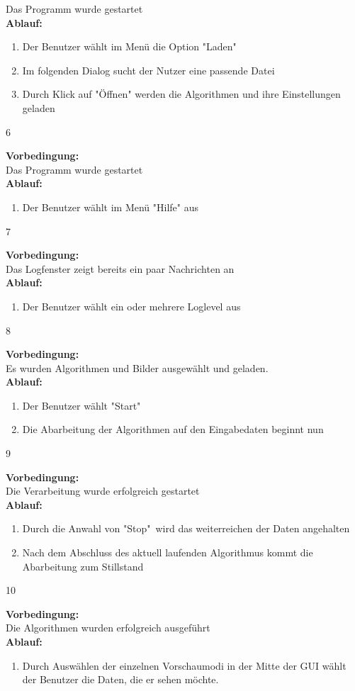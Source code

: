 {{{			Das Programm wurde gestartet
			\\\textbf{Ablauf:}
			\begin{enumerate}
				\item Der Benutzer wählt im Menü die Option "{}Laden"
				\item Im folgenden Dialog sucht der Nutzer eine passende Datei
				\item Durch Klick auf "{}Öffnen" werden die Algorithmen und ihre Einstellungen geladen
			\end{enumerate}
		}
		{6}{
			\textbf{Vorbedingung:}\\
			Das Programm wurde gestartet
			\\\textbf{Ablauf:}
			\begin{enumerate}
				\item Der Benutzer wählt im Menü "{}Hilfe" aus
			\end{enumerate}
		}
		{7}{
			\textbf{Vorbedingung:}\\
			Das Logfenster zeigt bereits ein paar Nachrichten an
			\\\textbf{Ablauf:}
			\begin{enumerate}
				\item Der Benutzer wählt ein oder mehrere Loglevel aus
			\end{enumerate}
		}
		{8}{
			\textbf{Vorbedingung:}\\
			Es wurden Algorithmen und Bilder ausgewählt und geladen.
			\\\textbf{Ablauf:}
			\begin{enumerate}
				\item Der Benutzer wählt "{}Start"
				\item Die Abarbeitung der Algorithmen auf den Eingabedaten beginnt nun
			\end{enumerate}
		}
		{9}{
			\textbf{Vorbedingung:}\\
			Die Verarbeitung wurde erfolgreich gestartet
			\\\textbf{Ablauf:}
			\begin{enumerate}
				\item Durch die Anwahl von "{}Stop" wird das weiterreichen der Daten angehalten
				\item Nach dem Abschluss des aktuell laufenden Algorithmus kommt die Abarbeitung zum Stillstand
			\end{enumerate}
		}
		{10}{
			\textbf{Vorbedingung:}\\
			Die Algorithmen wurden erfolgreich ausgeführt
			\\\textbf{Ablauf:}
			\begin{enumerate}
				\item Durch Auswählen der einzelnen Vorschaumodi in der Mitte der GUI wählt der Benutzer die Daten, die er sehen möchte.
			\end{enumerate}
		}
	}	
}